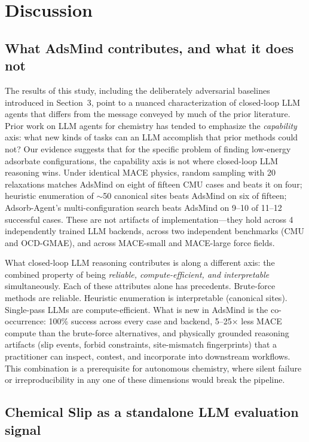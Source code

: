 \section{Discussion}

\subsection{What AdsMind contributes, and what it does not}

The results of this study, including the deliberately adversarial baselines introduced in Section~3, point to a nuanced characterization of closed-loop LLM agents that differs from the message conveyed by much of the prior literature.
Prior work on LLM agents for chemistry has tended to emphasize the \textit{capability} axis: what new kinds of tasks can an LLM accomplish that prior methods could not?
Our evidence suggests that for the specific problem of finding low-energy adsorbate configurations, the capability axis is not where closed-loop LLM reasoning wins.
Under identical MACE physics, random sampling with 20 relaxations matches AdsMind on eight of fifteen CMU cases and beats it on four; heuristic enumeration of $\sim$50 canonical sites beats AdsMind on six of fifteen; Adsorb-Agent's multi-configuration search beats AdsMind on 9--10 of 11--12 successful cases.
These are not artifacts of implementation---they hold across 4 independently trained LLM backends, across two independent benchmarks (CMU and OCD-GMAE), and across MACE-small and MACE-large force fields.

What closed-loop LLM reasoning contributes is along a different axis: the combined property of being \textit{reliable, compute-efficient, and interpretable} simultaneously.
Each of these attributes alone has precedents. Brute-force methods are reliable.
Heuristic enumeration is interpretable (canonical sites). Single-pass LLMs are compute-efficient.
What is new in AdsMind is the co-occurrence: 100\% success across every case and backend, 5--25$\times$ less MACE compute than the brute-force alternatives, and physically grounded reasoning artifacts (slip events, forbid constraints, site-mismatch fingerprints) that a practitioner can inspect, contest, and incorporate into downstream workflows.
This combination is a prerequisite for autonomous chemistry, where silent failure or irreproducibility in any one of these dimensions would break the pipeline.

\subsection{Chemical Slip as a standalone LLM evaluation signal}

